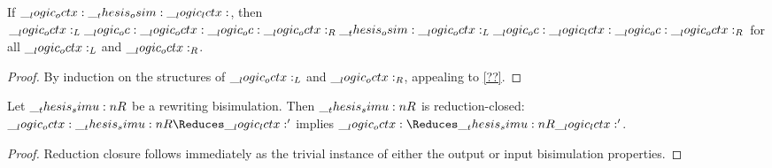 



\begin{theorem}
  If $\__logic_octx: \__thesis_osim: \__logic_lctx:$, then $\__logic_octx:_L \__logic_oc: \__logic_octx: \__logic_oc: \__logic_octx:_R \__thesis_osim: \__logic_octx:_L \__logic_oc: \__logic_lctx: \__logic_oc: \__logic_octx:_R$ for all $\__logic_octx:_L$ and $\__logic_octx:_R$.
\end{theorem}
\begin{proof}
  By induction on the structures of $\__logic_octx:_L$ and $\__logic_octx:_R$, appealing to \cref{??}.
\end{proof}


\begin{theorem}
  Let $\__thesis_simu:n {R}$ be a rewriting bisimulation.
  Then $\__thesis_simu:n {R}$ is reduction-closed: $\octx \simu{R}\Reduces \lctx'$ implies $\octx \Reduces\simu{R} \lctx'$.
\end{theorem}
%
\begin{proof}
  Reduction closure follows immediately as the trivial instance of either the output or input bisimulation properties.
\end{proof}




